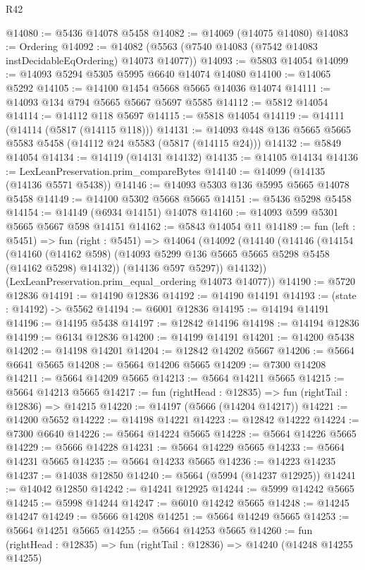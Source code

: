 \begin{lexlean}{R42}
\begin{coremodule}
@14080 := @5436 @14078 @5458
@14082 := @14069 (@14075 @14080)
@14083 := Ordering
@14092 := @14082 (@5563 (@7540 @14083 (@7542 @14083 instDecidableEqOrdering) @14073 @14077))
@14093 := @5803 @14054
@14099 := @14093 @5294 @5305 @5995 @6640 @14074 @14080
@14100 := @14065 @5292
@14105 := @14100 @1454 @5668 @5665 @14036 @14074
@14111 := @14093 @134 @794 @5665 @5667 @5697 @5585
@14112 := @5812 @14054
@14114 := @14112 @118 @5697
@14115 := @5818 @14054
@14119 := @14111 (@14114 (@5817 (@14115 @118)))
@14131 := @14093 @448 @136 @5665 @5665 @5583 @5458 (@14112 @24 @5583 (@5817 (@14115 @24)))
@14132 := @5849 @14054
@14134 := @14119 (@14131 @14132)
@14135 := @14105 @14134
@14136 := LexLeanPreservation.prim_compareBytes
@14140 := @14099 (@14135 (@14136 @5571 @5438))
@14146 := @14093 @5303 @136 @5995 @5665 @14078 @5458
@14149 := @14100 @5302 @5668 @5665
@14151 := @5436 @5298 @5458
@14154 := @14149 (@6934 @14151) @14078
@14160 := @14093 @599 @5301 @5665 @5667 @598 @14151
@14162 := @5843 @14054 @11
@14189 := fun (left : @5451) =>
  fun (right : @5451) =>
  @14064
    (@14092
      (@14140
        (@14146
          (@14154
            (@14160 (@14162 @598) (@14093 @5299 @136 @5665 @5665 @5298 @5458 (@14162 @5298) @14132))
            (@14136 @597 @5297))
          @14132))
      (LexLeanPreservation.prim_equal_ordering @14073 @14077))
@14190 := @5720 @12836
@14191 := @14190 @12836
@14192 := @14190 @14191
@14193 := (state : @14192) -> @5562
@14194 := @6001 @12836
@14195 := @14194 @14191
@14196 := @14195 @5438
@14197 := @12842 @14196
@14198 := @14194 @12836
@14199 := @6134 @12836
@14200 := @14199 @14191
@14201 := @14200 @5438
@14202 := @14198 @14201
@14204 := @12842 @14202 @5667
@14206 := @5664 @6641 @5665
@14208 := @5664 @14206 @5665
@14209 := @7300 @14208
@14211 := @5664 @14209 @5665
@14213 := @5664 @14211 @5665
@14215 := @5664 @14213 @5665
@14217 := fun (rightHead : @12835) => fun (rightTail : @12836) => @14215
@14220 := @14197 (@5666 (@14204 @14217))
@14221 := @14200 @5652
@14222 := @14198 @14221
@14223 := @12842 @14222
@14224 := @7300 @6640
@14226 := @5664 @14224 @5665
@14228 := @5664 @14226 @5665
@14229 := @5666 @14228
@14231 := @5664 @14229 @5665
@14233 := @5664 @14231 @5665
@14235 := @5664 @14233 @5665
@14236 := @14223 @14235
@14237 := @14038 @12850
@14240 := @5664 (@5994 (@14237 @12925))
@14241 := @14042 @12850
@14242 := @14241 @12925
@14244 := @5999 @14242 @5665
@14245 := @5998 @14244
@14247 := @6010 @14242 @5665
@14248 := @14245 @14247
@14249 := @5666 @14208
@14251 := @5664 @14249 @5665
@14253 := @5664 @14251 @5665
@14255 := @5664 @14253 @5665
@14260 := fun (rightHead : @12835) => fun (rightTail : @12836) => @14240 (@14248 @14255 @14255)

\end{coremodule}
\end{lexlean}
